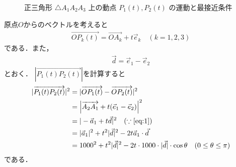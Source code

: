 \documentclass[../../main.tex]{subfiles}
\begin{document}
\begin{figure}[htb]
  \caption{正三角形 $\triangle A_1A_2A_3$ 上の動点 $P_1(t), P_2(t)$ の運動と最接近条件}
  \label{fig:motion_overview}
\end{figure}

原点$O$からのベクトルを考えると
\begin{align}
  \overrightarrow{OP_k(t)} = \overrightarrow{OA_k} + t \vec{e}_k \quad (k=1,2,3)
\end{align}
である．また，
\begin{align}
  \vec{d} = \vec{e}_1 - \vec{e}_2 \label{eq:1}
\end{align}
とおく．
$|\overrightarrow{P_1(t) P_2(t)}|$を計算すると
\begin{align}
  |\overrightarrow{P_1(t) P_2(t)}|^2
  &= |\overrightarrow{OP_1(t)} - \overrightarrow{OP_2(t)}|^2 \\
  &= \left| \overrightarrow{A_2 A_1} + t (\vec{e}_1 - \vec{e}_2) \right|^2 \\
  &= |-\vec{a}_1 + t \vec{d}|^2 \quad (\because{\text{\cref{eq:1}}}) \\
  &= |\vec{a}_1|^2 + t^2 |\vec{d}|^2 - 2t \vec{a}_1 \cdot \vec{d} \\
  &= 1000^2 + t^2 |\vec{d}|^2 - 2t \cdot 1000 \cdot |\vec{d}| \cdot \cos \theta \quad (0 \le \theta \le \pi)
\end{align}
である．
\end{document}
